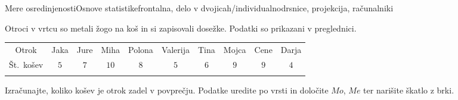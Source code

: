 \begin{priprava}{3}{}{Mere osredinjenosti}{Osnove statistike}{frontalna, delo v dvojicah/individualno}{drsnice, projekcija, računalniki}
    \begin{naloga}
     
     Otroci v vrtcu so metali žogo na koš in si zapisovali dosežke. Podatki so prikazani v preglednici. 

         \begin{table}[H]
             \centering
             \begin{tabular}{||c|c|c|c|c|c|c|c|c|c||} 
             \hhline{|t:==========:t|}
             \rowcolor[rgb]{0.843,0.718,0.718} 
             Otrok  & Jaka & Jure & Miha & Polona & Valerija & Tina & Mojca & Cene & Darja   \\ 
             \hhline{|:==========:|}
             Št.~košev & $5$ & $7$ & $10$ & $8$ & $5$ & $6$ & $9$ & $9$& $4$  \\ 
             \hhline{|b:==========:b|}
             \end{tabular}
         \end{table}

        Izračunajte, koliko košev je otrok zadel v povprečju. Podatke uredite po vrsti in določite $Mo$, $Me$ ter narišite škatlo z brki.

    \end{naloga}



\end{priprava}